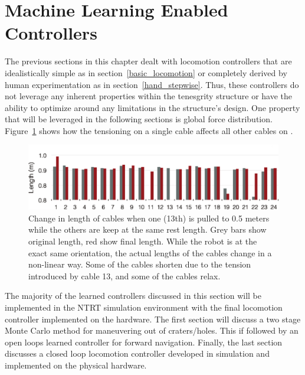 \section{Machine Learning Enabled Controllers}
\label{sec:machine_learning}
The previous sections in this chapter dealt with locomotion controllers that are idealistically simple as in section~\ref{basic_locomotion} or completely derived by human experimentation as in section~\ref{hand_stepwise}.
Thus, these controllers do not leverage any inherent properties within the tenesgrity structure or have the ability to optimize around any limitations in the structure's design.
One property that will be leveraged in the following sections is global force distribution.
Figure~\ref{fig:nonlinear} shows how the tensioning on a single cable affects all other cables on \SB{}.

\begin{figure}[thpb]
\centering
\includegraphics[width=\columnwidth]{tex/ASME-journal/results/actuate1/actuate1.eps}
\caption{Change in length of cables when one (13th) is pulled to 0.5 meters while the others are keep at the same rest length.  Grey bars show original length, red show final length. While the robot is at the exact same orientation, the actual lengths of the cables change in a non-linear way.  Some of the cables shorten due to the tension introduced by cable 13, and some of the cables relax.}
\label{fig:nonlinear}
\end{figure}

The majority of the learned controllers discussed in this section will be implemented in the NTRT simulation environment with the final locomotion controller implemented on the \SB{} hardware.
The first section will discuss a two stage Monte Carlo method for maneuvering \SB{} out of craters/holes.
This if followed by an open loops learned controller for forward navigation.
Finally, the last section discusses a closed loop locomotion controller developed in simulation and implemented on the physical \SB{} hardware.

